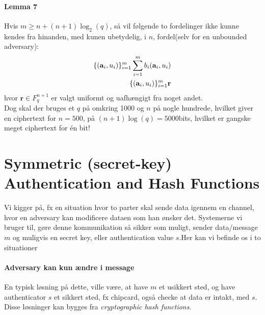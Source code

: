 \documentclass[paper=a4, fontsize=11pt]{scrartcl} %
\numberwithin{equation}{section} %
\numberwithin{figure}{section} %
\numberwithin{table}{section} %
\begin{document}
	\paragraph{\textbf{Lemma 7}} Hvis $m\geq n+(n+1)\log_2(q)$, så vil følgende to fordelinger ikke kunne kendes fra hinanden, med kunen ubetydelig, i $n$, fordel(selv for en unbounded adversary):
	\begin{align*}
	\{(\mathbf{a}_i,u_i)\}^m_{i=1}\vspace{1cm}\sum_{i=1}^{m}b_i(\mathbf{a}_i,u_i) \\
	\{(\mathbf{a}_i,u_i)\}^m_{i=1}\vspace{1cm}\mathbf{r}
	\end{align*}
	hvor $\mathbf{r}\in F^{n+1}_q$ er valgt uniformt og uafhængigt fra noget andet. \\
	
	Dog skal der bruges et $q$ på omkring 1000 og $n$ på nogle hundrede, hvilket giver en ciphertext for $n=500$, på $(n+1)\log(q)=5000$bits, hvilket er gangske meget ciphertext for én bit!
	
	\newpage
	
	\section{Symmetric (secret-key) Authentication and Hash Functions}
	
	Vi kigger på, fx en situation hvor to parter skal sende data igennem en channel, hvor en adversary kan modificere dataen som han ønsker det. Systemerne vi bruger til, gøre denne kommunikation så sikker som muligt, sender data/message $m$ og muligvis en secret key,  eller authentication value $s$.Her kan vi befinde os i to situationer
	
	\paragraph{\textbf{Adversary kan kun ændre i message}} En typisk løsning på dette, ville være, at have $m$ et usikkert sted, og have authenticator $s$ et sikkert sted, fx chipcard, også checke at data er intakt, med $s$. Disse løsninger kan bygges fra \textit{cryptographic hash functions}.
	
\end{document}
